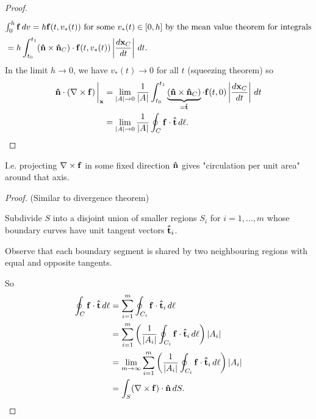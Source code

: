 \documentclass[10pt, a4paper]{article}
\begin{document}
\begin{lemma}
\begin{proof}
\begin{align*}
            \intertext{$\int_{0}^{h}\mathbf{f}\,dv = h\mathbf{f}(t, v_{*}(t))$ for some $v_{*}(t) \in [0, h]$ by the mean value theorem for integrals}
            &= h\int_{t_0}^{t_1}(\mathbf{\hat{n}} \times \mathbf{\hat{n}}_{C})\cdot\mathbf{f}(t, v_{*}(t))\left|\frac{d\mathbf{x}_{C}}{dt}\right|\,dt.
        \end{align*}
        In the limit $h \to 0$,
        we have $v_{*}(t) \to 0$ for all $t$
        (squeezing theorem)
        so
        \begin{align*}
            \mathbf{\hat{n}}\cdot(\mathbf{\nabla} \times \mathbf{f})\,\biggr|_{\mathbf{x}} &= \lim_{|A| \to 0}\frac{1}{|A|}\int_{t_0}^{t_1}\underbrace{(\mathbf{\hat{n}}\times\mathbf{\hat{n}}_{C})}_{=\mathbf{\hat{t}}}\cdot\mathbf{f}(t, 0)\left|\frac{d\mathbf{x}_{C}}{dt}\right|\,dt \\
            &= \lim_{|A| \to 0}\frac{1}{|A|}\oint_{C}\mathbf{f}\cdot\mathbf{\hat{t}}\,d\ell.
        \end{align*}
        \[
        \]
        
    \end{proof}
\end{lemma}
I.e. projecting $\mathbf{\nabla} \times \mathbf{f}$ in some fixed direction $\mathbf{\hat{n}}$ gives
"circulation per unit area"
around that axis.

\begin{theorem}[continues = mathmethII:thm:stokesthm]
    \begin{proof}
        (Similar to divergence theorem)

        Subdivide $S$ into a disjoint union of smaller regions $S_i$ for $i = 1, \dotsc, m$ whose boundary curves have unit tangent vectors $\mathbf{\hat{t}}_i$.

        Observe that each boundary segment is shared by two neighbouring regions with equal and opposite tangents.

        So
        \begin{align*}
            \oint_{C}\mathbf{f}\cdot\mathbf{\hat{t}}\,d\ell &= \sum_{i = 1}^{m}\oint_{C_i}\mathbf{f}\cdot\mathbf{\hat{t}}_i\,d\ell \\
            &= \sum_{i = 1}^{m}\left(\frac{1}{|A_i|}\oint_{C_i}\mathbf{f}\cdot\mathbf{\hat{t}}_i\,d\ell\right)|A_i| \\
            &= \lim_{m \to \infty}\sum_{i = 1}^{m}\left(\frac{1}{|A_i|}\oint_{C_i}\mathbf{f}\cdot\mathbf{\hat{t}}_i\,d\ell\right)|A_i| \\
            &= \int_{S}(\mathbf{\nabla} \times \mathbf{f})\cdot\mathbf{\hat{n}}\,dS.
        \end{align*}
    \end{proof}
\end{theorem}
\end{document}
